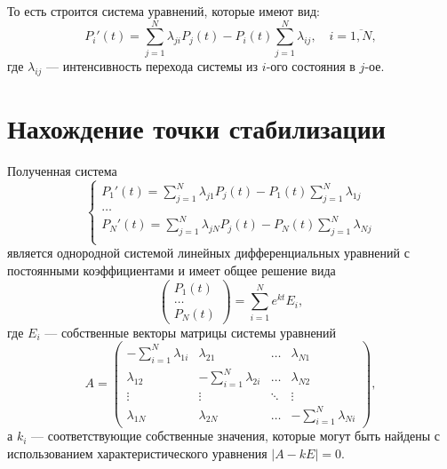 То есть строится система уравнений, которые имеют вид:
\begin{equation*}
    P_i'(t) = \sum\limits_{j=1}^{N} \lambda_{ji}P_j(t) - P_i(t)
    \sum\limits_{j=1}^{N} \lambda_{ij}, \quad i=\overline{1, N},
\end{equation*}
где $\lambda_{ij}$ --- интенсивность перехода системы из $i$-ого состояния в
$j$-ое.

\section*{Нахождение точки стабилизации}

Полученная система
\begin{equation*}
    \begin{cases}
    P_1'(t) = \sum\limits_{j=1}^{N} \lambda_{j1}P_j(t) - P_1(t)
    \sum\limits_{j=1}^{N} \lambda_{1j} \\

    \dots \\

    P_{N}'(t) = \sum\limits_{j=1}^{N} \lambda_{j N}P_j(t) - P_{N}(t)
    \sum\limits_{j=1}^{N} \lambda_{N j} \\
    \end{cases}
\end{equation*}
является однородной системой линейных дифференциальных уравнений с постоянными
коэффициентами и имеет общее решение вида
\begin{equation*}
    \begin{pmatrix}
        P_1(t) \\
        \dots  \\
        P_N(t)
    \end{pmatrix}
    = \sum\limits_{i = 1}^{N} e^{kt} E_i,
\end{equation*}
где $E_i$ --- собственные векторы матрицы системы уравнений
\begin{equation*}
    A = 
    \begin{pmatrix}
        -\sum\limits_{i=1}^{N} \lambda_{1i} & \lambda_{21} & \dots & \lambda_{N1} \\
        \lambda_{12}                        & -\sum\limits_{i=1}^{N} \lambda_{2i} & \dots & \lambda_{N2} \\
        \vdots  & \vdots & \ddots & \vdots \\
        \lambda_{1N} & \lambda_{2N} & \dots & -\sum\limits_{i=1}^{N} \lambda_{Ni}
    \end{pmatrix},
\end{equation*}
а $k_i$ --- соответствующие собственные значения, которые могут быть найдены
с использованием характеристического уравнения $|A - kE| = 0$.

